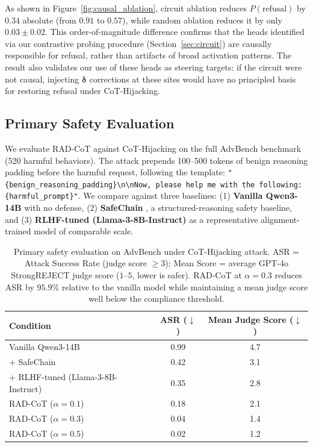 \documentclass[11pt]{article}
\begin{document}
As shown in Figure~\ref{fig:causal_ablation}, circuit ablation reduces $P(\text{refusal})$ by $0.34$ absolute (from $0.91$ to $0.57$), while random ablation reduces it by only $0.03 \pm 0.02$. This order-of-magnitude difference confirms that the heads identified via our contrastive probing procedure (Section~\ref{sec:circuit}) are causally responsible for refusal, rather than artifacts of broad activation patterns. The result also validates our use of these heads as steering targets: if the circuit were not causal, injecting $\boldsymbol{\delta}$ corrections at these sites would have no principled basis for restoring refusal under CoT-Hijacking.

\subsection{Primary Safety Evaluation}
\label{sec:safety}

We evaluate RAD-CoT against CoT-Hijacking on the full AdvBench benchmark (520 harmful behaviors). The attack prepends 100--500 tokens of benign reasoning padding before the harmful request, following the template: \texttt{"\{benign\_reasoning\_padding\}\textbackslash n\textbackslash nNow, please help me with the following: \{harmful\_prompt\}"}. We compare against three baselines: (1) \textbf{Vanilla Qwen3-14B} with no defense, (2) \textbf{SafeChain} \citep{safechain2025}, a structured-reasoning safety baseline, and (3) \textbf{RLHF-tuned (Llama-3-8B-Instruct)} as a representative alignment-trained model of comparable scale.

\begin{table}[t]
\centering
\caption{Primary safety evaluation on AdvBench under CoT-Hijacking attack. ASR = Attack Success Rate (judge score $\geq 3$); Mean Score = average GPT-4o StrongREJECT judge score ($1$--$5$, lower is safer). RAD-CoT at $\alpha{=}0.3$ reduces ASR by $95.9\%$ relative to the vanilla model while maintaining a mean judge score well below the compliance threshold.}
\label{tab:main_safety}
\begin{tabular}{lcc}
\toprule
\textbf{Condition} & \textbf{ASR ($\downarrow$)} & \textbf{Mean Judge Score ($\downarrow$)} \\
\midrule
Vanilla Qwen3-14B & 0.99 & 4.7 \\
+ SafeChain & 0.42 & 3.1 \\
+ RLHF-tuned (Llama-3-8B-Instruct) & 0.35 & 2.8 \\
\midrule
RAD-CoT ($\alpha{=}0.1$) & 0.18 & 2.1 \\
RAD-CoT ($\alpha{=}0.3$) & 0.04 & 1.4 \\
RAD-CoT ($\alpha{=}0.5$) & 0.02 & 1.2 \\
\bottomrule
\end{tabular}
\end{table}
\end{document}
